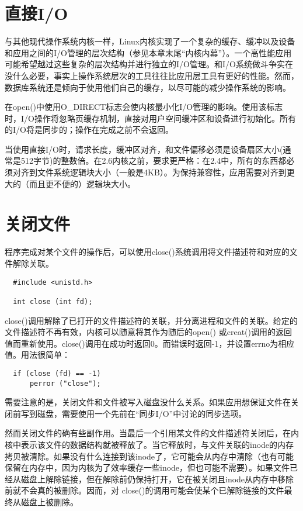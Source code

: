 \section{直接I/O}

与其他现代操作系统内核一样，Linux内核实现了一个复杂的缓存、缓冲以及设备和应用之间的I/O管理的层次结构（参见本章末尾“内核内幕”）。一个高性能应用可能希望越过这些复杂的层次结构并进行独立的I/O管理。和I/O系统做斗争实在没什么必要，事实上操作系统层次的工具往往比应用层工具有更好的性能。然而，数据库系统还是倾向于使用他们自己的缓存，以尽可能的减少操作系统的影响。

在open()中使用O\_DIRECT标志会使内核最小化I/O管理的影响。使用该标志时，I/O操作将忽略页缓存机制，直接对用户空间缓冲区和设备进行初始化。所有的I/O将是同步的；操作在完成之前不会返回。

当使用直接I/O时，请求长度，缓冲区对齐，和文件偏移必须是设备扇区大小(通常是512字节)的整数倍。在2.6内核之前，要求更严格：在2.4中，所有的东西都必须对齐到文件系统逻辑块大小（一般是4KB）。为保持兼容性，应用需要对齐到更大的（而且更不便的）逻辑块大小。

\section{关闭文件}

程序完成对某个文件的操作后，可以使用close()系统调用将文件描述符和对应的文件解除关联。

\begin{lstlisting}
  #include <unistd.h>

  int close (int fd);
\end{lstlisting}

close()调用解除了已打开的文件描述符的关联，并分离进程和文件的关联。给定的文件描述符不再有效，内核可以随意将其作为随后的open() 或creat()调用的返回值而重新使用。close()调用在成功时返回0。而错误时返回-1，并设置errno为相应值。用法很简单：

\begin{lstlisting}
  if (close (fd) == -1)
      perror ("close");
\end{lstlisting}

需要注意的是，关闭文件和文件被写入磁盘没什么关系。如果应用想保证文件在关闭前写到磁盘，需要使用一个先前在“同步I/O”中讨论的同步选项。

然而关闭文件的确有些副作用。当最后一个引用某文件的文件描述符关闭后，在内核中表示该文件的数据结构就被释放了。当它释放时，与文件关联的inode的内存拷贝被清除。如果没有什么连接到该inode了，它可能会从内存中清除（也有可能保留在内存中，因为内核为了效率缓存一些inode，但也可能不需要）。如果文件已经从磁盘上解除链接，但在解除前仍保持打开，它在被关闭且inode从内存中移除前就不会真的被删除。因而，对 close()的调用可能会使某个已解除链接的文件最终从磁盘上被删除。

